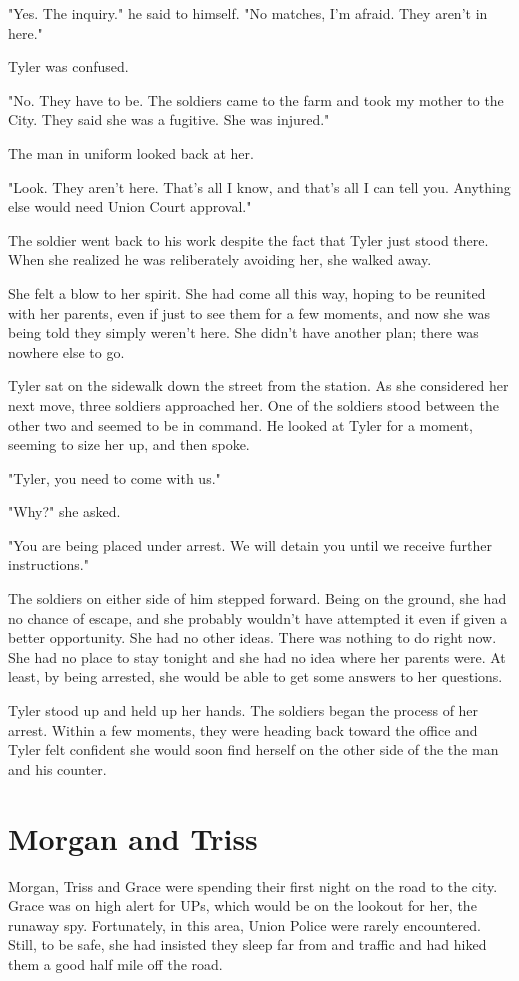 \documentclass[courier]{sffms}
\begin{document}
"Yes. The inquiry." he said to himself. "No matches, I'm
afraid. They aren't in here."

Tyler was confused.

"No. They have to be. The soldiers came to the farm and took
my mother to the City. They said she was a fugitive. She was
injured."

The man in uniform looked back at her.

"Look. They aren't here. That's all I know, and that's all
I can tell you. Anything else would need Union Court
approval."

The soldier went back to his work despite the fact that
Tyler just stood there. When she realized he was reliberately
avoiding her, she walked away.

She felt a blow to her spirit. She had come all this way,
hoping to be reunited with her parents, even if just to
see them for a few moments, and now she was being
told they simply weren't here. She didn't have another
plan; there was nowhere else to go.

Tyler sat on the sidewalk down the street from the
station. As she considered her next move, three
soldiers approached her. One of the soldiers stood
between the other two and seemed to be in command.
He looked at Tyler for a moment, seeming to size
her up, and then spoke.

"Tyler, you need to come with us."

"Why?" she asked.

"You are being placed under arrest. We will detain
you until we receive further instructions."

The soldiers on either side of him stepped forward.
Being on the ground, she had no chance of escape,
and she probably wouldn't have attempted it even
if given a better opportunity. She had no other
ideas. There was nothing to do right now. She had
no place to stay tonight and she had no idea where
her parents were. At least, by being arrested, she
would be able to get some answers to her questions.

Tyler stood up and held up her hands. The soldiers
began the process of her arrest. Within a few
moments, they were heading back toward the
office and Tyler felt confident she would soon
find herself on the other side of the the man and
his counter.

\chapter{Morgan and Triss}
Morgan, Triss and Grace were spending their first
night on the road to the city. Grace was on high
alert for UPs, which would be on the lookout for
her, the runaway spy. Fortunately, in this area,
Union Police were rarely encountered. Still, to be
safe, she had insisted they sleep far from and traffic
and had hiked them a good half mile off the road.
\end{document}

